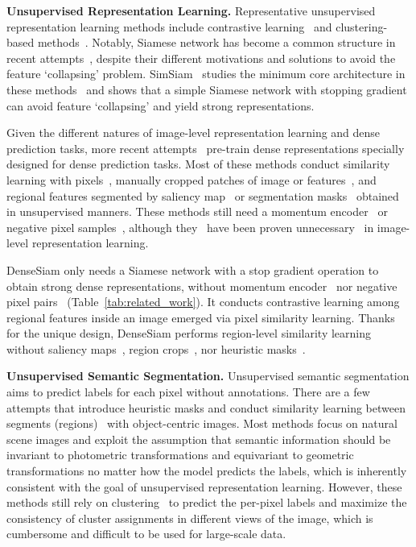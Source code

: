 \documentclass[runningheads]{llncs}
\begin{document}
\noindent\textbf{Unsupervised Representation Learning.}
Representative unsupervised representation learning methods include contrastive learning~\cite{examplar_cnn, instance_discrimination, amdim, simclr, moco, mocov2} and clustering-based methods~\cite{deepcluster, swav, scan, online_clustering}.
Notably, Siamese network has become a common structure in recent attempts~\cite{byol, swav, simclr}, despite their different motivations and solutions to avoid the feature `collapsing' problem.
SimSiam~\cite{simsiam} studies the minimum core architecture in these methods~\cite{byol, swav, simclr} and shows that a simple Siamese network with stopping gradient can avoid feature `collapsing' and yield strong representations.

Given the different natures of image-level representation learning and dense prediction tasks,
more recent attempts~\cite{resim, detco, scrl, insloc, updetr, CAST, detcon, densecl, pixpro, vader, orl, soco} pre-train dense representations specially designed for dense prediction tasks.
Most of these methods conduct similarity learning with pixels~\cite{vader, densecl, pixpro},
manually cropped patches of image or features~\cite{resim, detco, scrl, soco, orl}, and regional features segmented by saliency map~\cite{CAST} or segmentation masks~\cite{detcon} obtained in unsupervised manners.
These methods still need a momentum encoder~\cite{scrl, detco, densecl, pixpro, vader} or negative pixel samples~\cite{densecl, pixpro, vader},
although they~\cite{byol, simclr} have been proven unnecessary~\cite{simsiam} in image-level representation learning.

DenseSiam only needs a Siamese network with a stop gradient operation to obtain strong dense representations, without momentum encoder~\cite{scrl, detco, densecl, pixpro, vader}
nor negative pixel pairs~\cite{densecl, pixpro, vader} (Table~\ref{tab:related_work}).
It conducts contrastive learning among regional features inside an image emerged via pixel similarity learning.
Thanks for the unique design, DenseSiam performs region-level similarity learning without saliency maps~\cite{CAST}, region crops~\cite{scrl, resim, detco}, nor heuristic masks~\cite{detcon}.

\noindent\textbf{Unsupervised Semantic Segmentation.}
Unsupervised semantic segmentation aims to predict labels for each pixel without annotations.
There are a few attempts that introduce heuristic masks and conduct similarity learning between segments (regions)~\cite{maskcontrast, segsort} with object-centric images.
Most methods focus on natural scene images and exploit the assumption that semantic information should be invariant to photometric transformations and equivariant to geometric transformations no matter how the model predicts the labels,
which is inherently consistent with the goal of unsupervised representation learning.
However, these methods still rely on clustering~\cite{picie, iic, autoregressive} to predict the per-pixel labels and maximize the consistency of cluster assignments in different views of the image,
which is cumbersome and difficult to be used for large-scale data.
\end{document}

